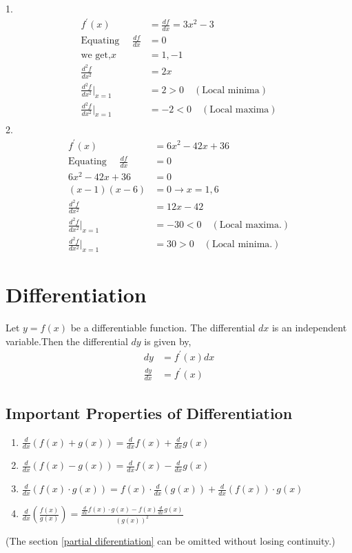\begin{answer}1.
	\begin{align*}
	f^{\prime}(x)&=\frac{df}{dx}=3x^{2}-3\\
	\text{Equating }\quad\frac{df}{dx} &=0\\
	\text{we get,}x&=1,-1\\
	\frac{d^{2}f}{dx^{2}}&=2x\\
	\frac{d^{2}f}{dx^{2}}\bigg\rvert_{x=1}&=2>0\quad(\text{Local minima})\\
	\frac{d^{2}f}{dx^{2}}\bigg\rvert_{x=1}&=-2<0\quad(\text{Local maxima})\\
	\end{align*}
	2.
	\begin{align*}
	 f^{\prime}(x)&=6 x^{2}-42 x+36\\
	 \text{Equating }\quad\frac{df}{dx} &=0\\
	  6 x^{2}-42 x+36&= 0\\
	  (x-1)(x-6)&=0 \rightarrow x=1,6 \\
	  \frac{d^{2}f}{dx^{2}}&=12 x-42\\
	  \frac{d^{2}f}{dx^{2}}\bigg\rvert_{x=1}&=-30<0\quad(\text{Local maxima.})\\
	  \frac{d^{2}f}{dx^{2}}\bigg\rvert_{x=1}&=30>0\quad(\text{Local minima.})
	  \end{align*}
	
\end{answer}

\section{Differentiation}
Let $y=f(x)$ be a differentiable function. The differential $d x$ is an independent variable.Then the differential $d y$ is given by,
\begin{align*}
d y&=f^{\prime}(x) d x\\
\frac{d y}{d x}&=f^{\prime}(x)
\end{align*}
\subsection{Important Properties of Differentiation} 
\begin{enumerate}
	\item $\frac{d}{d x}(f(x)+g(x))=\frac{d}{d x} f(x)+\frac{d}{d x} g(x)$
	\item $\frac{d}{d x}(f(x)-g(x))=\frac{d}{d x} f(x)-\frac{d}{d x} g(x)$
	\item $\frac{d}{d x}(f(x) \cdot g(x))=f(x) \cdot \frac{d}{d x}(g(x))+\frac{d}{d x}(f(x)) \cdot g(x)$
	\item $\frac{d}{d x}\left(\frac{f(x)}{g(x)}\right)=\frac{\frac{d}{d x} f(x) \cdot g(x)-f(x) \frac{d}{d x} g(x)}{(g(x))^{2}}$
\end{enumerate}
\textcolor{ocre}{(\large * The section \ref{partial diferentiation} can be omitted without losing continuity.)}
